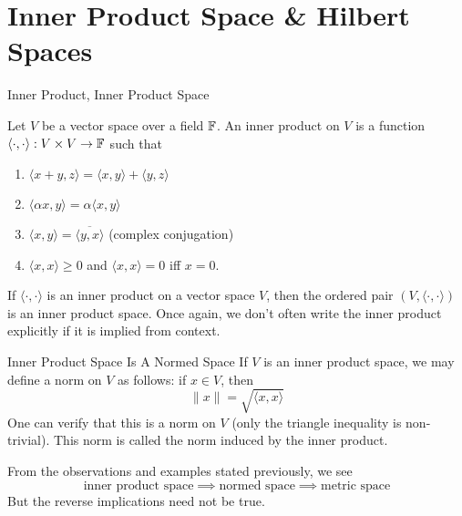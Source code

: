 \documentclass[10pt]{beamer}
\begin{document}
		\section{Inner Product Space \& Hilbert Spaces} 

		\begin{frame}{Inner Product, Inner Product Space}
				\begin{definition}
						Let $V$ be a vector space over a field $\mathbb{F}$. An \alert{inner product} on $V$ is a function $\langle \cdot, \cdot \rangle: V\times V\to \mathbb{F}$ such that 
						\begin{enumerate}
								\item $\langle x+y, z \rangle = \langle x, y\rangle + \langle y, z \rangle$ 
								\item $\langle \alpha x, y\rangle = \alpha \langle x, y \rangle$
								\item $\langle x, y \rangle = \overline{\langle y, x \rangle}$ (complex conjugation)
								\item $\langle x, x \rangle \geq 0$ and $\langle x, x \rangle = 0$ iff $x = 0$. 
						\end{enumerate}
						If $\langle \cdot, \cdot \rangle$ is an inner product on a vector space $V$, then the ordered pair $(V, \langle \cdot, \cdot \rangle)$ is an \alert{inner product space}. Once again, we don't often write the inner product explicitly if it is implied from context. 
				\end{definition}	
		\end{frame}

		\begin{frame}{Inner Product Space Is A Normed Space}
				If $V$ is an inner product space, we may define a norm on $V$ as follows: if $x\in V$, then 
				\begin{equation*}
						\|x\| = \sqrt{\langle x, x \rangle}
				\end{equation*}
				One can verify that this is a norm on $V$ (only the triangle inequality is non-trivial). This norm is called the \alert{norm induced by the inner product}.
				
				\begin{block}{}
						From the observations and examples stated previously, we see 
						\begin{equation*}
								\text{inner product space} \implies \text{normed space} \implies \text{metric space}
						\end{equation*}
						But the reverse implications need not be true.
				\end{block}
		\end{frame}
\end{document}
